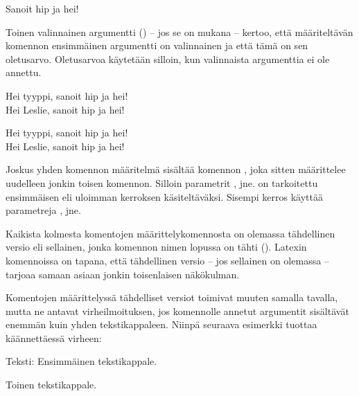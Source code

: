 \begin{tulossis}
  Sanoit hip ja hei!
\end{tulossis}

Toinen valinnainen argumentti () -- jos se on mukana --
kertoo, että määriteltävän komennon ensimmäinen argumentti on
valinnainen ja että tämä on sen oletusarvo. Oletusarvoa käytetään
silloin, kun valinnaista argumenttia ei ole annettu.


\begin{koodilohkosis}
  \newcommand{\komento}[3][tyyppi]{Hei #1, sanoit #2 ja #3!}
  \komento{hip}{hei} \\
  \komento[Leslie]{hip}{hei}
\end{koodilohkosis}

\begin{tulossis}
  Hei tyyppi, sanoit hip ja hei! \\
  Hei Leslie, sanoit hip ja hei!
\end{tulossis}

Joskus yhden komennon määritelmä sisältää komennon , joka sitten määrittelee uudelleen jonkin toisen
komennon. Silloin parametrit ,  jne. on
tarkoitettu ensimmäisen eli uloimman kerroksen käsiteltäväksi. Sisempi
kerros käyttää parametreja ,  jne.

Kaikista kolmesta komentojen määrittelykomennosta on olemassa
tähdellinen versio eli sellainen, jonka komennon nimen lopussa on tähti
(\koodi{*}). Latexin komennoissa on tapana, että tähdellinen versio --
jos sellainen on olemassa -- tarjoaa samaan asiaan jonkin toisenlaisen
näkökulman.

\begin{koodilohkosis}
  \newcommand*     {\nimi}[n][oletus]{määritelmä}
  \renewcommand*   {\nimi}[n][oletus]{määritelmä}
  \providecommand* {\nimi}[n][oletus]{määritelmä}
\end{koodilohkosis}

Komentojen määrittelyssä tähdelliset versiot toimivat muuten samalla
tavalla, mutta ne antavat virheilmoituksen, jos komennolle annetut
argumentit sisältävät enemmän kuin yhden tekstikappaleen. Niinpä
seuraava esimerkki tuottaa käännettäessä virheen:

\begin{koodilohkosis}
  \newcommand*{\komento}[1]{Teksti: #1}

  \komento{
    Ensimmäinen tekstikappale.

    Toinen tekstikappale.
  }
\end{koodilohkosis}

